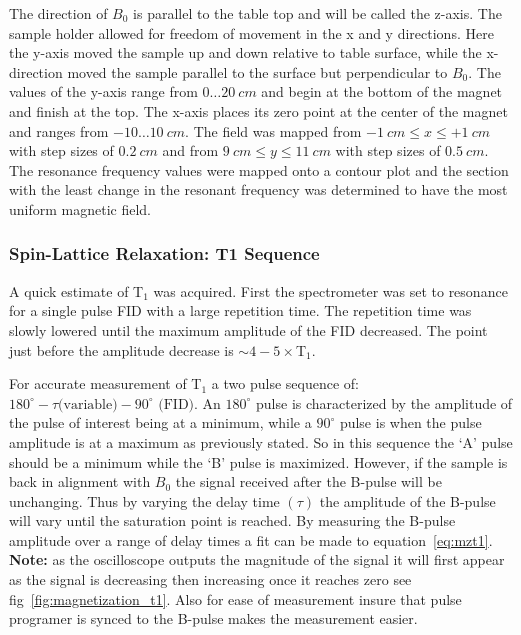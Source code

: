 \documentclass[
reprint,
amsmath,amssymb,
aps,
tikz,
border=5pt
]{revtex4-1}
\begin{document}
    The direction of $B_0$ is parallel to the table top and will be called the z-axis. The sample holder allowed for freedom of movement in the x and y directions. Here the y-axis moved the sample up and down relative to table surface, while the x-direction moved the sample parallel to the surface but perpendicular to $B_0$. The values of the y-axis range from $0\ldots20~cm$ and begin at the bottom of the magnet and finish at the top. The x-axis places its zero point at the center of the magnet and ranges from $-10\ldots10~cm$. The field was mapped from $-1~cm \leq x \leq +1~cm$ with step sizes of $0.2~cm$ and from $9~cm \leq y \leq 11~cm$ with step sizes of $0.5~cm$. The resonance frequency values were mapped onto a contour plot and the section with the least change  in the resonant frequency was determined to have the most uniform magnetic field. 

\subsubsection*{Spin-Lattice Relaxation: T1 Sequence}


    A quick estimate of T$_1$ was acquired. First the spectrometer was set to resonance for a single pulse FID with a large repetition time. The repetition time was slowly lowered until the maximum amplitude of the FID decreased. The point just before the amplitude decrease is $\sim 4-5\times$T$_1$.

    For accurate measurement of T$_1$ a two pulse sequence of: $180^{\circ}- \tau \text{(variable)} - 90^{\circ}\text{ (FID)}$. An $180^{\circ}$ pulse is characterized by the amplitude of the pulse of interest being at a minimum, while a $90^{\circ}$ pulse is when the pulse amplitude is at a maximum as previously stated. So in this sequence the `A' pulse should be a minimum while the `B' pulse is maximized. However, if the sample is back in alignment with $B_0$ the signal received after the B-pulse will be unchanging. Thus by varying the delay time $(\tau )$ the amplitude of the B-pulse will vary until the saturation point is reached. By measuring the B-pulse amplitude over a range of delay times a fit can be made to equation~\ref{eq:mzt1}. \textbf{Note:} as the oscilloscope outputs the magnitude of the signal it will first appear as the signal is decreasing then increasing once it reaches zero see fig~\ref{fig:magnetization_t1}. Also for ease of measurement insure that pulse programer is synced to the B-pulse makes the measurement easier. 
\end{document}

